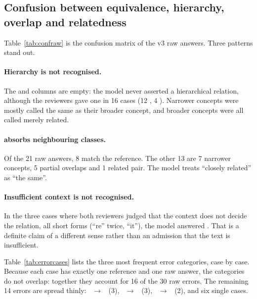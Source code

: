 \subsection{Confusion between equivalence, hierarchy, overlap and relatedness}

Table~\ref{tab:confraw} is the confusion matrix of the v3 raw answers. Three patterns stand out.

\begin{table}[H]
\centering
\small
\resizebox{\textwidth}{!}{}
\caption[{Confusion matrix, v3 raw answers (45 cases)}]{Confusion matrix, v3 raw answers against the R02/R03 agreement (45 cases). Diagonal in green, errors shaded by count.}
\label{tab:confraw}
\end{table}

\paragraph{Hierarchy is not recognised.} The \PA{} and \CH{} columns are empty: the model never asserted a hierarchical relation, although the reviewers gave one in 16 cases (12 \CH, 4 \PA). Narrower concepts were mostly called the same as their broader concept, and broader concepts were all called merely related.

\paragraph{\SC{} absorbs neighbouring classes.} Of the 21 raw \SC{} answers, 8 match the reference. The other 13 are 7 narrower concepts, 5 partial overlaps and 1 related pair. The model treats ``closely related'' as ``the same''.

\paragraph{Insufficient context is not recognised.} In the three cases where both reviewers judged that the context does not decide the relation, all short forms (``re'' twice, ``it''), the model answered \UN. That is a definite claim of a different sense rather than an admission that the text is insufficient.

Table~\ref{tab:errorcases} lists the three most frequent error categories, case by case. Because each case has exactly one reference and one raw answer, the categories do not overlap: together they account for 16 of the 30 raw errors. The remaining 14 errors are spread thinly: \CH~$\rightarrow$~\RE{} (3), \IE~$\rightarrow$~\UN{} (3), \SC~$\rightarrow$~\UN{} (2), and six single cases.


